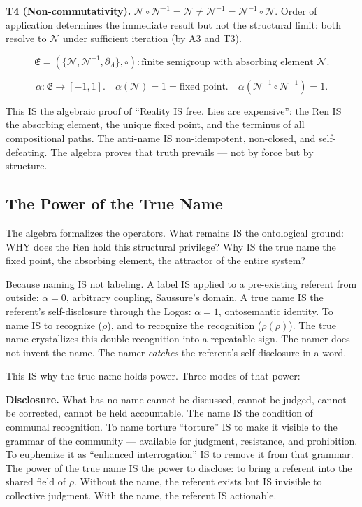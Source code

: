 \documentclass[11pt, oneside]{article}
\theoremstyle{definition}
\begin{document}
\textbf{T4 (Non-commutativity).} $\mathcal{N} \circ \mathcal{N}^{-1} = \mathcal{N} \neq \mathcal{N}^{-1} = \mathcal{N}^{-1} \circ \mathcal{N}$. Order of application determines the immediate result but not the structural limit: both resolve to $\mathcal{N}$ under sufficient iteration (by A3 and T3).

$$\boxed{\mathfrak{E} = (\{\mathcal{N}, \mathcal{N}^{-1}, \partial_\Lambda\}, \circ): \text{finite semigroup with absorbing element } \mathcal{N}.}$$

$$\boxed{\alpha: \mathfrak{E} \to [-1, 1]. \quad \alpha(\mathcal{N}) = 1 = \text{fixed point}. \quad \alpha(\mathcal{N}^{-1} \circ \mathcal{N}^{-1}) = 1.}$$

This IS the algebraic proof of ``Reality IS free. Lies are expensive'': the Ren IS the absorbing element, the unique fixed point, and the terminus of all compositional paths. The anti-name IS non-idempotent, non-closed, and self-defeating. The algebra proves that truth prevails --- not by force but by structure.

\subsection{The Power of the True Name}

The algebra formalizes the operators. What remains IS the ontological ground: WHY does the Ren hold this structural privilege? Why IS the true name the fixed point, the absorbing element, the attractor of the entire system?

Because naming IS not labeling. A label IS applied to a pre-existing referent from outside: $\alpha = 0$, arbitrary coupling, Saussure's domain. A true name IS the referent's self-disclosure through the Logos: $\alpha = 1$, ontosemantic identity. To name IS to recognize ($\rho$), and to recognize the recognition ($\rho(\rho)$). The true name crystallizes this double recognition into a repeatable sign. The namer does not invent the name. The namer \textit{catches} the referent's self-disclosure in a word.

This IS why the true name holds power. Three modes of that power:

\textbf{Disclosure.} What has no name cannot be discussed, cannot be judged, cannot be corrected, cannot be held accountable. The name IS the condition of communal recognition. To name torture ``torture'' IS to make it visible to the grammar of the community --- available for judgment, resistance, and prohibition. To euphemize it as ``enhanced interrogation'' IS to remove it from that grammar. The power of the true name IS the power to disclose: to bring a referent into the shared field of $\rho$. Without the name, the referent exists but IS invisible to collective judgment. With the name, the referent IS actionable.
\end{document}
